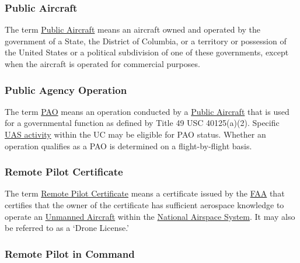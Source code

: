 \documentclass[
]{book}
\begin{document}
\hypertarget{PA}{%
\subsubsection*{Public Aircraft}\label{PA}}

The term \protect\hyperlink{PA}{Public Aircraft} means an aircraft owned and operated by the government of a State, the District of Columbia, or a territory or possession of the United States or a political subdivision of one of these governments, except when the aircraft is operated for commercial purposes.



\hypertarget{PAO}{%
\subsubsection*{Public Agency Operation}\label{PAO}}

The term \protect\hyperlink{PAO}{PAO} means an operation conducted by a \protect\hyperlink{PA}{Public Aircraft} that is used for a governmental function as defined by Title 49 USC 40125(a)(2). Specific \protect\hyperlink{UASactivity}{UAS activity} within the UC may be eligible for PAO status. Whether an operation qualifies as a PAO is determined on a flight-by-flight basis.





\hypertarget{RPC}{%
\subsubsection*{Remote Pilot Certificate}\label{RPC}}

The term \protect\hyperlink{RPC}{Remote Pilot Certificate} means a certificate issued by the \protect\hyperlink{FAA}{FAA} that certifies that the owner of the certificate has sufficient aerospace knowledge to operate an \protect\hyperlink{UA}{Unmanned Aircraft} within the \protect\hyperlink{NAS}{National Airspace System}. It may also be referred to as a `Drone License.'



\hypertarget{RPIC}{%
\subsubsection*{Remote Pilot in Command}\label{RPIC}}
\end{document}
